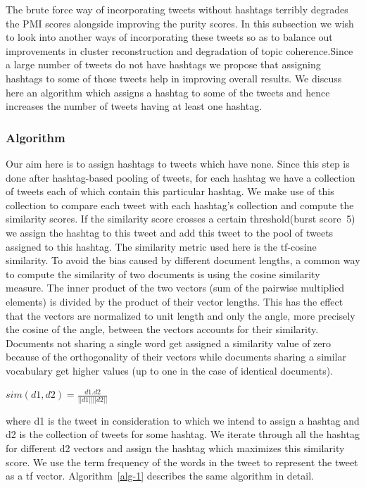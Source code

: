 \documentclass[10pt,a5paper,twoside]{article}
\begin{document}
The brute force way of incorporating tweets without hashtags terribly
degrades the PMI scores alongside improving the purity scores. In this
subsection we wish to look into another ways of incorporating these
tweets so as to balance out improvements in cluster reconstruction and
degradation of topic coherence.Since a large number of tweets do not
have hashtags we propose that assigning hashtags to some of those
tweets help in improving overall results. We discuss here an algorithm
which assigns a hashtag to some of the tweets and hence increases the
number of tweets having at least one hashtag.


\subsubsection{Algorithm}

Our aim here is to assign hashtags to tweets which have none. Since
this step is done after hashtag-based pooling of tweets, for each
hashtag we have a collection of tweets each of which contain this
particular hashtag. We make use of this collection to compare each
tweet with each hashtag's collection and compute the similarity
scores. If the similarity score crosses a certain threshold(burst
score $\>$5) we assign the hashtag to this tweet and add this tweet to
the pool of tweets assigned to this hashtag. The similarity metric
used here is the tf-cosine similarity. To avoid the bias caused by
different document lengths, a common way to compute the similarity of
two documents is using the cosine similarity measure. The inner
product of the two vectors (sum of the pairwise multiplied elements)
is divided by the product of their vector lengths. This has the effect
that the vectors are normalized to unit length and only the angle,
more precisely the cosine of the angle, between the vectors accounts
for their similarity. Documents not sharing a single word get assigned
a similarity value of zero because of the orthogonality of their
vectors while documents sharing a similar vocabulary get higher values
(up to one in the case of identical documents).

\begin{center}
$sim(d1,d2) = \frac{d1 . d2}{||d1|| ||d2||}$
\end{center}

where d1 is the tweet in consideration to which we intend to assign a
hashtag and d2 is the collection of tweets for some hashtag. We
iterate through all the hashtag for different d2 vectors and assign
the hashtag which maximizes this similarity score. We use the term
frequency of the words in the tweet to represent the tweet as a tf
vector. Algorithm~\ref{alg-1} describes the same algorithm in detail.
\end{document}
